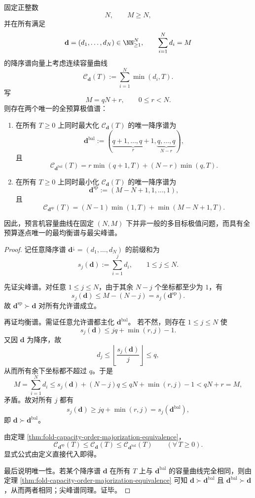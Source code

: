 \begin{theorem}[固定长度与总质量下的全预算极值谱]\label{thm:fold-capacity-global-extremizers-fixed-mass}
固定正整数
\[
N,\qquad M\ge N,
\]
并在所有满足
\[
\mathbf d=(d_1,\dots,d_N)\in\NN_{\ge 1}^N,
\qquad
\sum_{i=1}^{N}d_i=M
\]
的降序谱向量上考虑连续容量曲线
\[
\mathcal C_{\mathbf d}(T):=\sum_{i=1}^{N}\min(d_i,T).
\]
写
\[
M=qN+r,\qquad 0\le r<N.
\]
则存在两个唯一的全预算极值谱：
\begin{enumerate}
  \item 在所有 \(T\ge 0\) 上同时最大化 \(\mathcal C_{\mathbf d}(T)\) 的唯一降序谱为
  \[
  \mathbf d^{\mathrm{bal}}
  :=
  (\underbrace{q+1,\dots,q+1}_{r},
  \underbrace{q,\dots,q}_{N-r}),
  \]
  且
  \[
  \mathcal C_{\mathbf d^{\mathrm{bal}}}(T)
  =
  r\min(q+1,T)+(N-r)\min(q,T).
  \]
  \item 在所有 \(T\ge 0\) 上同时最小化 \(\mathcal C_{\mathbf d}(T)\) 的唯一降序谱为
  \[
  \mathbf d^{\mathrm{sp}}
  :=
  (M-N+1,1,\dots,1),
  \]
  且
  \[
  \mathcal C_{\mathbf d^{\mathrm{sp}}}(T)
  =
  (N-1)\min(1,T)+\min(M-N+1,T).
  \]
\end{enumerate}
因此，预言机容量曲线在固定 \((N,M)\) 下并非一般的多目标极值问题，而具有全预算逐点唯一的最均衡谱与最尖峰谱。
\end{theorem}
\begin{proof}
记任意降序谱 \(\mathbf d^\downarrow=(d_1,\dots,d_N)\) 的前缀和为
\[
s_j(\mathbf d):=\sum_{i=1}^{j}d_i,\qquad 1\le j\le N.
\]

先证尖峰谱。对任意 \(1\le j\le N\)，由于其余 \(N-j\) 个坐标都至少为 \(1\)，有
\[
s_j(\mathbf d)\le M-(N-j)=s_j(\mathbf d^{\mathrm{sp}}).
\]
故 \(\mathbf d^{\mathrm{sp}}\succ \mathbf d\) 对所有允许谱成立。

再证均衡谱。需证任意允许谱都主化 \(\mathbf d^{\mathrm{bal}}\)。
若不然，则存在 \(1\le j\le N\) 使
\[
s_j(\mathbf d)\le jq+\min(r,j)-1.
\]
又因 \(\mathbf d\) 为降序，故
\[
d_j\le \left\lfloor \frac{s_j(\mathbf d)}{j}\right\rfloor\le q,
\]
从而所有余下坐标都不超过 \(q\)。于是
\[
M=\sum_{i=1}^{N}d_i
\le s_j(\mathbf d)+(N-j)q
\le qN+\min(r,j)-1
<qN+r=M,
\]
矛盾。故对所有 \(j\) 都有
\[
s_j(\mathbf d)\ge jq+\min(r,j)=s_j(\mathbf d^{\mathrm{bal}}),
\]
即 \(\mathbf d\succ \mathbf d^{\mathrm{bal}}\)。

由定理 \ref{thm:fold-capacity-order-majorization-equivalence}，
\[
\mathcal C_{\mathbf d^{\mathrm{sp}}}(T)\le \mathcal C_{\mathbf d}(T)\le \mathcal C_{\mathbf d^{\mathrm{bal}}}(T)
\qquad(\forall\,T\ge 0).
\]
显式公式由定义直接代入即得。

最后说明唯一性。若某个降序谱 \(\mathbf d\) 在所有 \(T\) 上与 \(\mathbf d^{\mathrm{bal}}\) 的容量曲线完全相同，则由定理 \ref{thm:fold-capacity-order-majorization-equivalence} 可知 \(\mathbf d\succ \mathbf d^{\mathrm{bal}}\) 且 \(\mathbf d^{\mathrm{bal}}\succ \mathbf d\)，从而两者相同；尖峰谱同理。证毕。
\end{proof}

